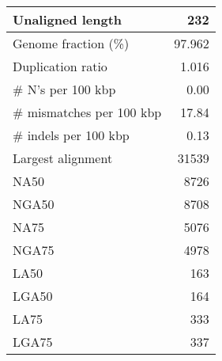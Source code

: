 \documentclass[12pt,a4paper]{article}
\begin{document}
\begin{table}[ht]
\begin{center}
\begin{tabular}{|l*{1}{|r}|}
Unaligned length & 232 \\ \hline
Genome fraction (\%) & 97.962 \\ \hline
Duplication ratio & 1.016 \\ \hline
\# N's per 100 kbp & 0.00 \\ \hline
\# mismatches per 100 kbp & 17.84 \\ \hline
\# indels per 100 kbp & 0.13 \\ \hline
Largest alignment & 31539 \\ \hline
NA50 & 8726 \\ \hline
NGA50 & 8708 \\ \hline
NA75 & 5076 \\ \hline
NGA75 & 4978 \\ \hline
LA50 & 163 \\ \hline
LGA50 & 164 \\ \hline
LA75 & 333 \\ \hline
LGA75 & 337 \\ \hline
\end{tabular}
\end{center}
\end{table}
\end{document}
